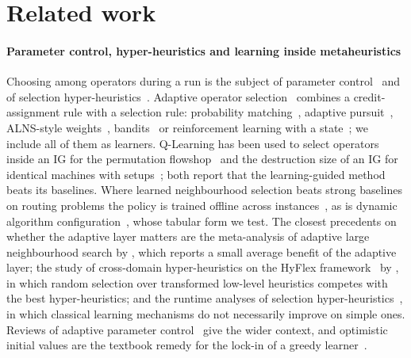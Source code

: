 \section{Related work}
\label{sec:related}
\paragraph{Parameter control, hyper-heuristics and learning inside metaheuristics} Choosing among operators during a run is the subject of parameter control~\cite{EibenEtal1999,KarafotiasEtal2015} and of selection hyper-heuristics~\cite{BurkeEtal2013,DrakeEtal2020}. Adaptive operator selection~\cite{FialhoEtal2010} combines a credit-assignment rule with a selection rule: probability matching~\cite{Goldberg1990}, adaptive pursuit~\cite{Thierens2005}, ALNS-style weights~\cite{PisingerRopke2007}, bandits~\cite{AuerEtal2002,DaCostaEtal2008} or reinforcement learning with a state~\cite{BengioBengio2021}; we include all of them as learners. Q-Learning has been used to select operators inside an IG for the permutation flowshop~\cite{KarimiMamaghanEtal2023} and the destruction size of an IG for identical machines with setups~\cite{MissaouiOSullivan2026}; both report that the learning-guided method beats its baselines. Where learned neighbourhood selection beats strong baselines on routing problems the policy is trained offline across instances~\cite{SonneratEtal2021}, as is dynamic algorithm configuration~\cite{BiedenkappEtal2020,EimerEtal2021}, whose tabular form we test. The closest precedents on whether the adaptive layer matters are the meta-analysis of adaptive large neighbourhood search by \citet{TurkesEtal2021}, which reports a small average benefit of the adaptive layer; the study of cross-domain hyper-heuristics on the HyFlex framework~\cite{OchoaEtal2012} by \citet{SobotkaEtal2025}, in which random selection over transformed low-level heuristics competes with the best hyper-heuristics; and the runtime analyses of selection hyper-heuristics~\cite{AlanaziLehre2014}, in which classical learning mechanisms do not necessarily improve on simple ones. Reviews of adaptive parameter control~\cite{AletiMoser2016} give the wider context, and optimistic initial values are the textbook remedy for the lock-in of a greedy learner~\cite{SuttonBarto2018,RashidEtal2020}.

